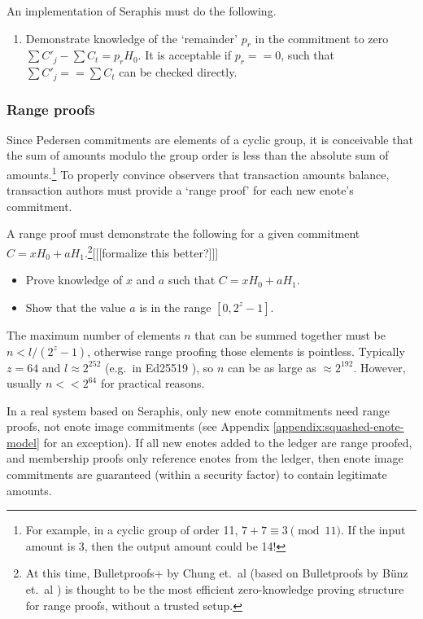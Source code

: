 An implementation of Seraphis must do the following.

\begin{enumerate}
    \item Demonstrate knowledge of the `remainder' $p_r$ in the commitment to zero $\sum C'_j - \sum C_t = p_r H_0$. It is acceptable if $p_r == 0$, such that $\sum C'_j == \sum C_t$ can be checked directly.
\end{enumerate}

\subsubsection{Range proofs}
\label{subsubsec:confidential-transactions-range-proofs}

Since Pedersen commitments are elements of a cyclic group, it is conceivable that the sum of amounts modulo the group order is less than the absolute sum of amounts.\footnote{For example, in a cyclic group of order 11, $7 + 7 \equiv 3 \pmod{11}$. If the input amount is 3, then the output amount could be 14!} To properly convince observers that transaction amounts balance, transaction authors must provide a `range proof' for each new enote's commitment.

A range proof must demonstrate the following for a given commitment $C = x H_0 + a H_1$.\footnote{At this time, Bulletproofs+ by Chung et.\ al \cite{bulletproofs_plus} (based on Bulletproofs by B\"{u}nz et.\ al \cite{Bulletproofs_paper}) is thought to be the most efficient zero-knowledge proving structure for range proofs, without a trusted setup.}[[[formalize this better?]]]

\begin{itemize}
    \item Prove knowledge of $x$ and $a$ such that $C = x H_0 + a H_1$.

    \item Show that the value $a$ is in the range $[0, 2^{z} - 1]$.
\end{itemize}

The maximum number of elements $n$ that can be summed together must be $n < l / (2^z - 1)$, otherwise range proofing those elements is pointless. Typically $z = 64$ and $l \approx 2^{252}$ (e.g.\ in Ed25519 \cite{Bernstein2012-high-speed-high-security-ed25519}), so $n$ can be as large as $\approx 2^{192}$. However, usually $n << 2^{64}$ for practical reasons.

In a real system based on Seraphis, only new enote commitments need range proofs, not enote image commitments (see Appendix \ref{appendix:squashed-enote-model} for an exception). If all new enotes added to the ledger are range proofed, and membership proofs only reference enotes from the ledger, then enote image commitments are guaranteed (within a security factor) to contain legitimate amounts.


